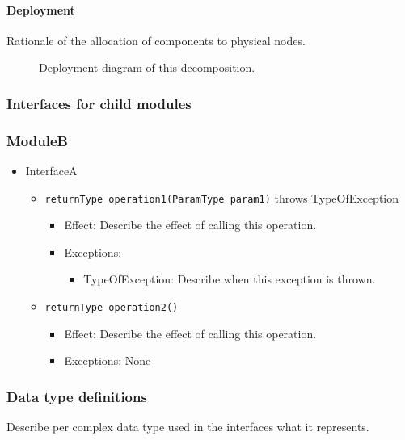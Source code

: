 \documentclass[a4paper,10pt]{article}
\begin{document}
\paragraph{Deployment}
Rationale of the allocation of components to physical nodes.

\begin{figure}[!htp]
    \centering
    \caption{Deployment diagram of this decomposition.
        }\label{fig:it2-depl_main}
\end{figure}

\subsubsection{Interfaces for child modules}
\subsubsection*{ModuleB}
\begin{itemize}
    \item InterfaceA
    \begin{itemize}
        \item \texttt{returnType operation1(ParamType param1)} throws TypeOfException
        \begin{itemize}
            \item Effect: Describe the effect of calling this operation.
            \item Exceptions:
            \begin{itemize}
                \item TypeOfException: Describe when this exception is thrown.
            \end{itemize}
        \end{itemize}

        \item \texttt{returnType operation2()}
        \begin{itemize}
            \item Effect: Describe the effect of calling this operation.
            \item Exceptions: None
         \end{itemize}
    \end{itemize}
\end{itemize}

\subsubsection{Data type definitions}
Describe per complex data type used in the interfaces what it represents.
\end{document}
